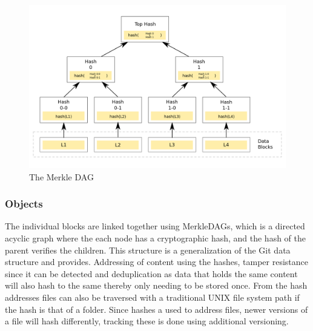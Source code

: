 \begin{figure}
    \centering
    \includegraphics[width=\textwidth]{gfx/merkle_tree}
    \caption{The Merkle \ac{DAG}}
    \label{fig:merkle}
\end{figure}

\subsubsection{Objects}
The individual blocks are linked together using Merkle\ac{DAG}s, which is a directed acyclic graph where the each node has a cryptographic hash, and the hash of the parent verifies the children. This structure is a generalization of the Git data structure and provides. Addressing of content using the hashes, tamper resistance since it can be detected and deduplication as data that holds the same content will also hash to the same thereby only needing to be stored once. From the hash addresses files can also be traversed with a traditional UNIX file system path if the hash is that of a folder.
Since hashes a used to address files, newer versions of a file will hash differently, tracking these is done using additional versioning.

